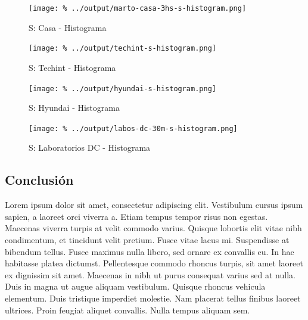\documentclass[final,narroweqnarray,inline]{ieee}
\begin{document}
    \begin{figure}[h]\begin{center}
      \texttt{[image: \%
      ../output/marto-casa-3hs-s-histogram.png]}
      \vspace{-2em}
      \caption{S: Casa - Histograma}
      \label{marto-casa-3hs-s-histogram}
    \end{center}\end{figure}
    \begin{figure}[h]\begin{center}
      \texttt{[image: \%
      ../output/techint-s-histogram.png]}
      \vspace{-2em}
      \caption{S: Techint - Histograma}
      \label{techint-s-histogram}
    \end{center}\end{figure}
    \begin{figure}[h]\begin{center}
      \texttt{[image: \%
      ../output/hyundai-s-histogram.png]}
      \vspace{-2em}
      \caption{S: Hyundai - Histograma}
      \label{hyundai-s-histogram}
    \end{center}\end{figure}
    \begin{figure}[h]\begin{center}
      \texttt{[image: \%
      ../output/labos-dc-30m-s-histogram.png]}
      \vspace{-2em}
      \caption{S: Laboratorios DC - Histograma}
      \label{labos-dc-30m-s-histogram}
    \end{center}\end{figure}

  \subsection{Conclusión}

Lorem ipsum dolor sit amet, consectetur adipiscing elit. Vestibulum cursus ipsum sapien, a laoreet orci viverra a. Etiam tempus tempor risus non egestas. Maecenas viverra turpis at velit commodo varius. Quisque lobortis elit vitae nibh condimentum, et tincidunt velit pretium. Fusce vitae lacus mi. Suspendisse at bibendum tellus. Fusce maximus nulla libero, sed ornare ex convallis eu. In hac habitasse platea dictumst. Pellentesque commodo rhoncus turpis, sit amet laoreet ex dignissim sit amet. Maecenas in nibh ut purus consequat varius sed at nulla. Duis in magna ut augue aliquam vestibulum. Quisque rhoncus vehicula elementum. Duis tristique imperdiet molestie. Nam placerat tellus finibus laoreet ultrices. Proin feugiat aliquet convallis. Nulla tempus aliquam sem.
\end{document}
